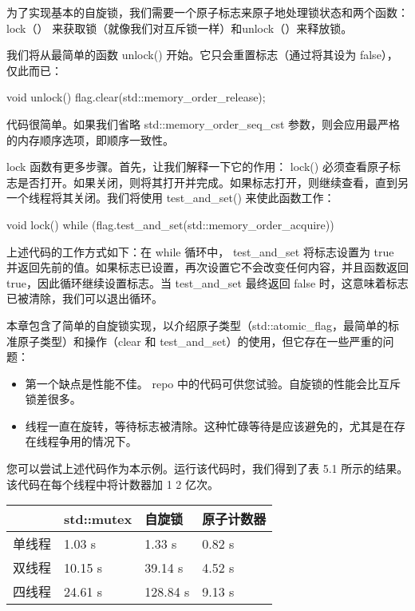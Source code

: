 为了实现基本的自旋锁，我们需要一个原子标志来原子地处理锁状态和两个函数： lock（） 来获取锁（就像我们对互斥锁一样）和unlock（）来释放锁。


我们将从最简单的函数 unlock() 开始。它只会重置标志（通过将其设为 false），仅此而已：

\begin{cpp}
void unlock()
{
    flag.clear(std::memory_order_release);
}
\end{cpp}

代码很简单。如果我们省略 std::memory\_order\_seq\_cst 参数，则会应用最严格的内存顺序选项，即顺序一致性。


lock 函数有更多步骤。首先，让我们解释一下它的作用： lock() 必须查看原子标志是否打开。如果关闭，则将其打开并完成。如果标志打开，则继续查看，直到另一个线程将其关闭。我们将使用 test\_and\_set() 来使此函数工作：

\begin{cpp}
void lock()
{
    while (flag.test_and_set(std::memory_order_acquire)) {}
}
\end{cpp}

上述代码的工作方式如下：在 while 循环中， test\_and\_set 将标志设置为 true 并返回先前的值。如果标志已设置，再次设置它不会改变任何内容，并且函数返回 true，因此循环继续设置标志。当 test\_and\_set 最终返回 false 时，这意味着标志已被清除，我们可以退出循环。


本章包含了简单的自旋锁实现，以介绍原子类型（std::atomic\_flag，最简单的标准原子类型）和操作（clear 和 test\_and\_set）的使用，但它存在一些严重的问题：

\begin{itemize}
\item
第一个缺点是性能不佳。 repo 中的代码可供您试验。自旋锁的性能会比互斥锁差很多。

\item
线程一直在旋转，等待标志被清除。这种忙碌等待是应该避免的，尤其是在存在线程争用的情况下。
\end{itemize}

您可以尝试上述代码作为本示例。运行该代码时，我们得到了表 5.1 所示的结果。该代码在每个线程中将计数器加 1 2 亿次。

\begin{longtable}{|l|l|l|l|}
\hline
\textbf{} & \textbf{std::mutex} & \textbf{自旋锁} & \textbf{原子计数器} \\ \hline
\endfirsthead
%
\endhead
%
单线程       & 1.03 s              & 1.33 s       & 0.82 s         \\ \hline
双线程       & 10.15 s             & 39.14 s      & 4.52 s         \\ \hline
四线程       & 24.61 s             & 128.84 s     & 9.13 s         \\ \hline
\end{longtable}

